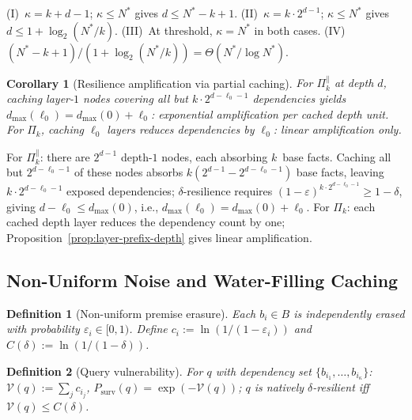 \documentclass[journal]{IEEEtran}
\makeatletter
\newtheorem{corollary}{Corollary}[section]
\newtheorem{definition}{Definition}[section]
\numberwithin{equation}{section}
\renewenvironment{proof}[1][\proofname]{\par
  \pushQED{\qed}%
  \normalfont \topsep6\p@\@plus6\p@\relax
  \trivlist
  \item[\hskip\labelsep
        \itshape
    #1\@addpunct{.}]\ignorespaces
}{%
  \popQED\endtrivlist\@endpefalse
}
\makeatother
\begin{document}
\begin{proof}
(I)~$\kappa=k{+}d{-}1$; $\kappa\le N^*$ gives $d\le N^*{-}k{+}1$.
(II)~$\kappa=k\cdot 2^{d-1}$; $\kappa\le N^*$ gives
$d\le 1+\log_2(N^*/k)$.
(III)~At threshold, $\kappa=N^*$ in both cases.
(IV)~$(N^*{-}k{+}1)/(1{+}\log_2(N^*/k))=\Theta(N^*/\log N^*)$.
\end{proof}

\begin{corollary}[Resilience amplification via partial caching]
\label{cor:resilience-amplification}
For $\Pi_k^{\parallel}$ at depth $d$, caching layer-$1$ nodes
covering all but $k\cdot 2^{d-\ell_0-1}$ dependencies yields
$d_{\max}(\ell_0)=d_{\max}(0)+\ell_0$: exponential
amplification per cached depth unit.
For $\Pi_k$, caching $\ell_0$ layers reduces dependencies by
$\ell_0$: linear amplification only.
\end{corollary}

\begin{proof}
For $\Pi_k^{\parallel}$: there are $2^{d-1}$ depth-$1$ nodes,
each absorbing $k$~base facts.
Caching all but $2^{d-\ell_0-1}$ of these nodes absorbs
$k(2^{d-1}-2^{d-\ell_0-1})$ base facts, leaving
$k\cdot 2^{d-\ell_0-1}$ exposed dependencies;
$\delta$-resilience requires
$(1{-}\varepsilon)^{k\cdot 2^{d-\ell_0-1}}\ge 1{-}\delta$,
giving $d-\ell_0\le d_{\max}(0)$, i.e.,
$d_{\max}(\ell_0)=d_{\max}(0)+\ell_0$.
For $\Pi_k$: each cached depth layer reduces the dependency
count by one; Proposition~\ref{prop:layer-prefix-depth} gives
linear amplification.
\end{proof}

\subsection{Non-Uniform Noise and Water-Filling Caching}
\label{subsec:water-filling}

\begin{definition}[Non-uniform premise erasure]
\label{def:nonuniform-erasure}
Each $b_i\in B$ is independently erased with probability
$\varepsilon_i\in[0,1)$.
Define $c_i:=\ln(1/(1{-}\varepsilon_i))$ and
$C(\delta):=\ln(1/(1{-}\delta))$.
\end{definition}

\begin{definition}[Query vulnerability]
\label{def:vulnerability-profile}
For $q$ with dependency set
$\{b_{i_1},\ldots,b_{i_\kappa}\}$:
$\mathcal{V}(q):=\sum_j c_{i_j}$,
$P_{\mathrm{surv}}(q)=\exp(-\mathcal{V}(q))$;
$q$ is natively $\delta$-resilient iff
$\mathcal{V}(q)\le C(\delta)$.
\end{definition}
\end{document}
